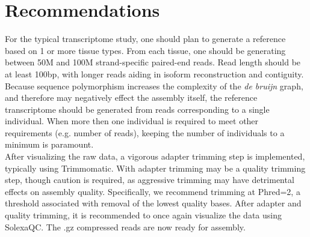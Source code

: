 \section*{Recommendations}


For the typical transcriptome study, one should plan to generate a reference based on 1 or more tissue types. From each tissue, one should be generating between 50M and 100M strand-specific paired-end reads. Read length should be at least 100bp, with longer reads aiding in isoform reconstruction and contiguity. Because sequence polymorphism increases the complexity of the \textit{de bruijn} graph, and therefore may negatively effect the assembly itself, the reference transcriptome should be generated from reads corresponding to a single individual. When more then one individual is required to meet other requirements (e.g. number of reads), keeping the number of individuals to a minimum is paramount. \\


After visualizing the raw data, a vigorous adapter trimming step is implemented, typically using Trimmomatic. With adapter trimming may be a quality trimming step, though caution is required, as aggressive trimming may have detrimental effects on assembly quality. Specifically, we recommend trimming at Phred=2, a threshold associated with removal of the lowest quality bases. After adapter and quality trimming, it is recommended to once again visualize the data using SolexaQC. The .gz compressed reads are now ready for assembly. \\
